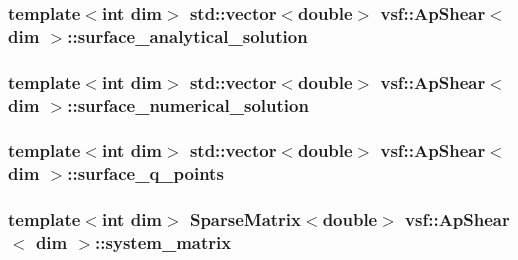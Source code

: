 \hypertarget{classvsf_1_1ApShear_a96a76f66c7155491bfe3d3c50d576fe9}{
\subsubsection[{surface\-\_\-analytical\-\_\-solution}]{\setlength{\rightskip}{0pt plus 5cm}template$<$int dim$>$ std\-::vector$<$double$>$ {\bf vsf\-::\-Ap\-Shear}$<$ dim $>$\-::surface\-\_\-analytical\-\_\-solution\hspace{0.3cm}{\ttfamily [private]}}}\label{classvsf_1_1ApShear_a96a76f66c7155491bfe3d3c50d576fe9}
\hypertarget{classvsf_1_1ApShear_adbc4b0f8e2a3282b27241a2088f9717d}{
\subsubsection[{surface\-\_\-numerical\-\_\-solution}]{\setlength{\rightskip}{0pt plus 5cm}template$<$int dim$>$ std\-::vector$<$double$>$ {\bf vsf\-::\-Ap\-Shear}$<$ dim $>$\-::surface\-\_\-numerical\-\_\-solution\hspace{0.3cm}{\ttfamily [private]}}}\label{classvsf_1_1ApShear_adbc4b0f8e2a3282b27241a2088f9717d}
\hypertarget{classvsf_1_1ApShear_a9aec407d8269d51336f50f3a9d94b53b}{
\subsubsection[{surface\-\_\-q\-\_\-points}]{\setlength{\rightskip}{0pt plus 5cm}template$<$int dim$>$ std\-::vector$<$double$>$ {\bf vsf\-::\-Ap\-Shear}$<$ dim $>$\-::surface\-\_\-q\-\_\-points\hspace{0.3cm}{\ttfamily [private]}}}\label{classvsf_1_1ApShear_a9aec407d8269d51336f50f3a9d94b53b}
\hypertarget{classvsf_1_1ApShear_a8735861f0a5530262407cd52b7a1b386}{
\subsubsection[{system\-\_\-matrix}]{\setlength{\rightskip}{0pt plus 5cm}template$<$int dim$>$ Sparse\-Matrix$<$double$>$ {\bf vsf\-::\-Ap\-Shear}$<$ dim $>$\-::system\-\_\-matrix\hspace{0.3cm}{\ttfamily [private]}}}\label{classvsf_1_1ApShear_a8735861f0a5530262407cd52b7a1b386}
